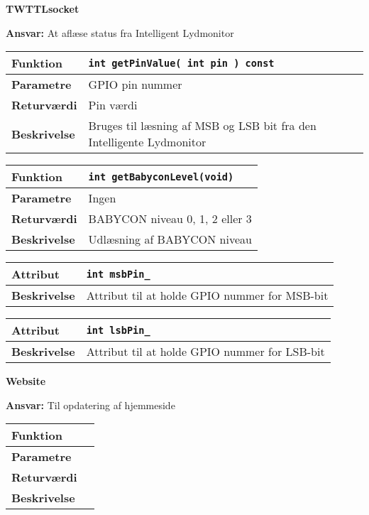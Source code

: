 {\centering
\textbf{TWTTLsocket}\par
}
\textbf{Ansvar:} At aflæse status fra Intelligent Lydmonitor \

\begin{center}
    \begin{tabular}{ | l | p{} |}
    \hline
    \textbf{Funktion}	& \verb+int getPinValue( int pin ) const +\\ \hline
    \textbf{Parametre} 	& GPIO pin nummer\\ \hline
    \textbf{Returværdi}	& Pin værdi\\ \hline
    \textbf{Beskrivelse}	& Bruges til læsning af MSB og LSB bit fra den Intelligente Lydmonitor\\ \hline
    \end{tabular}
\end{center}

\begin{center}
    \begin{tabular}{ | l | p{} |}
    \hline
    \textbf{Funktion}	& \verb+int getBabyconLevel(void) +\\ \hline
    \textbf{Parametre} 	& Ingen\\ \hline
    \textbf{Returværdi}	& BABYCON niveau 0, 1, 2 eller 3\\ \hline
    \textbf{Beskrivelse}	& Udlæsning af BABYCON niveau\\ \hline
    \end{tabular}
\end{center}

\begin{center}
    \begin{tabular}{ | l | p{} |}
    \hline
    \textbf{Attribut}	& \verb+int msbPin_ + \\ \hline
    \textbf{Beskrivelse}	& Attribut til at holde GPIO nummer for MSB-bit\\ \hline
    \end{tabular}
\end{center}

\begin{center}
    \begin{tabular}{ | l | p{} |}
    \hline
    \textbf{Attribut}	& \verb+int lsbPin_ +\\ \hline
    \textbf{Beskrivelse}	& Attribut til at holde GPIO nummer for LSB-bit\\ \hline
    \end{tabular}
\end{center}

{\centering
\textbf{Website}\par
}
\textbf{Ansvar:} Til opdatering af hjemmeside \

\begin{center}
    \begin{tabular}{ | l | p{} |}
    \hline
    \textbf{Funktion}	& \\ \hline
    \textbf{Parametre} 	& \\ \hline
    \textbf{Returværdi}	& \\ \hline
    \textbf{Beskrivelse}	& \\ \hline
    \end{tabular}
\end{center}